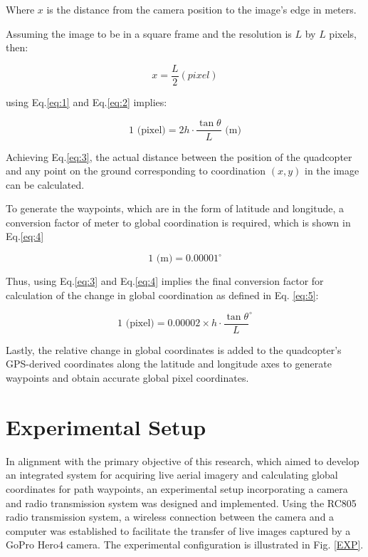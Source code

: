 \documentclass[conference]{IEEEtran}
\begin{document}
	Where \( x \) is the distance from the camera position to the image's edge in meters.
	
	Assuming the image to be in a square frame and the resolution is \( L \) by \( L \) pixels, then:
	
	\begin{equation}
		{x}=\frac{L}{2}\left(pixel\right)
		\label{eq:2}
	\end{equation}
	
	using Eq.\ref{eq:1} and Eq.\ref{eq:2} implies:
	
	\begin{equation}
		1 \text{ (pixel)} = 2h \cdot \frac{\tan \theta}{L} \text{ (m)}
		\label{eq:3}
	\end{equation}
	
	
	Achieving Eq.\ref{eq:3}, the actual distance between the position of the quadcopter and any point on the ground corresponding to coordination \((x, y)\) in the image can be calculated. 
	
	To generate the waypoints, which are in the form of latitude and longitude, a conversion factor of meter to global coordination is required, which is shown in Eq.\ref{eq:4} 
	
	\begin{equation}
		1 \text{ (m)} = 0.00001^\circ
		\label{eq:4}
	\end{equation}
	
	Thus, using Eq.\ref{eq:3} and Eq.\ref{eq:4} implies the final conversion factor for calculation of the change in global coordination as defined in Eq. \ref{eq:5}:
	
	\begin{equation}
		1 \text{ (pixel)} = 0.00002 \times h \cdot \frac{\tan \theta}{L}^\circ
		\label{eq:5}
	\end{equation}
	
	Lastly, the relative change in global coordinates is added to the quadcopter's GPS-derived coordinates along the latitude and longitude axes to generate waypoints and obtain accurate global pixel coordinates.
	
	
	\section{Experimental Setup}\label{Experimental Setup}
	In alignment with the primary objective of this research, which aimed to develop an integrated system for acquiring live aerial imagery and calculating global coordinates for path waypoints, an experimental setup incorporating a camera and radio transmission system was designed and implemented. Using the RC805 radio transmission system, a wireless connection between the camera and a computer was established to facilitate the transfer of live images captured by a GoPro Hero4 camera. The experimental configuration is illustrated in Fig.
	\ref{EXP}.
	
\end{document}

